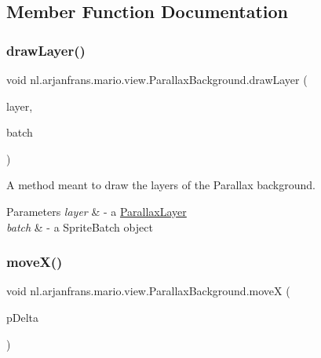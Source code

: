 \subsection{Member Function Documentation}
\mbox{\label{classnl_1_1arjanfrans_1_1mario_1_1view_1_1ParallaxBackground_a1be3d3c6f4d8e0e74f3cae3cc77bd86a}} 
\subsubsection{\texorpdfstring{draw\+Layer()}{drawLayer()}}
{\footnotesize\ttfamily void nl.\+arjanfrans.\+mario.\+view.\+Parallax\+Background.\+draw\+Layer (\begin{DoxyParamCaption}\item[{\hyperlink{classnl_1_1arjanfrans_1_1mario_1_1view_1_1ParallaxLayer}{Parallax\+Layer}}]{layer,  }\item[{Sprite\+Batch}]{batch }\end{DoxyParamCaption})\hspace{0.3cm}{\ttfamily [private]}}



A method meant to draw the layers of the Parallax background. 


\begin{DoxyParams}{Parameters}
{\em layer} & -\/ a \hyperlink{classnl_1_1arjanfrans_1_1mario_1_1view_1_1ParallaxLayer}{Parallax\+Layer} \\
\hline
{\em batch} & -\/ a Sprite\+Batch object \\
\hline
\end{DoxyParams}
\mbox{\label{classnl_1_1arjanfrans_1_1mario_1_1view_1_1ParallaxBackground_af5959c6214b1e4fecd434a8022baf449}} 
\subsubsection{\texorpdfstring{move\+X()}{moveX()}}
{\footnotesize\ttfamily void nl.\+arjanfrans.\+mario.\+view.\+Parallax\+Background.\+moveX (\begin{DoxyParamCaption}\item[{float}]{p\+Delta }\end{DoxyParamCaption})}



